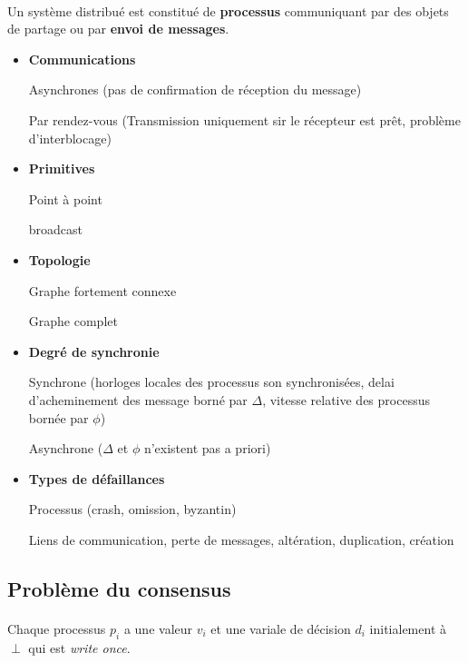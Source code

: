 \documentclass[french]{article}
\begin{document}
\paragraph{}Un système distribué est constitué de \textbf{processus} communiquant par des objets de partage ou par \textbf{envoi de messages}.\\

\begin{itemize}
	\item \textbf{Communications}
	
	Asynchrones (pas de confirmation de réception du message)
	
	Par rendez-vous (Transmission uniquement sir le récepteur est prêt, problème d'interblocage)
	
	\item \textbf{Primitives} 
	
	Point à point
	
	broadcast
	
	\item \textbf{Topologie}
	
	Graphe fortement connexe
	
	Graphe complet
	
	\item \textbf{Degré de synchronie}
	
	Synchrone (horloges locales des processus son synchronisées, delai d'acheminement des message borné par $\Delta$, vitesse relative des processus bornée par $\phi$)
	
	Asynchrone ($\Delta$ et $\phi$ n'existent pas a priori)
	
	\item \textbf{Types de défaillances}
	
	Processus (crash, omission, byzantin)
	
	Liens de communication, perte de messages, altération, duplication, création
\end{itemize}

\subsection{Problème du consensus}

\paragraph{}Chaque processus $p_i$ a une valeur $v_i$ et une variale de décision $d_i$ initialement à $\perp$ qui est \emph{write once}.
\end{document}
